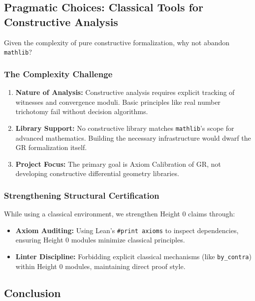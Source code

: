 \documentclass[11pt]{article}
\theoremstyle{definition}
\theoremstyle{remark}
\begin{document}
\subsection{Pragmatic Choices: Classical Tools for Constructive Analysis}

Given the complexity of pure constructive formalization, why not abandon \texttt{mathlib}?

\subsubsection{The Complexity Challenge}

\begin{enumerate}
\item \textbf{Nature of Analysis:} Constructive analysis requires explicit tracking of witnesses and convergence moduli. Basic principles like real number trichotomy fail without decision algorithms.

\item \textbf{Library Support:} No constructive library matches \texttt{mathlib}'s scope for advanced mathematics. Building the necessary infrastructure would dwarf the GR formalization itself.

\item \textbf{Project Focus:} The primary goal is Axiom Calibration of GR, not developing constructive differential geometry libraries.
\end{enumerate}

\subsubsection{Strengthening Structural Certification}

While using a classical environment, we strengthen Height 0 claims through:

\begin{itemize}
\item \textbf{Axiom Auditing:} Using Lean's \texttt{\#print axioms} to inspect dependencies, ensuring Height 0 modules minimize classical principles.

\item \textbf{Linter Discipline:} Forbidding explicit classical mechanisms (like \texttt{by\_contra}) within Height 0 modules, maintaining direct proof style.
\end{itemize}

\subsection{Conclusion}
\end{document}
